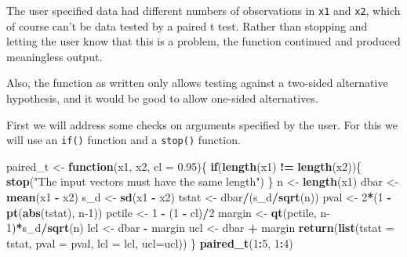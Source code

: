\documentclass[
]{krantz}
\newenvironment{Shaded}{\begin{snugshade}}{\end{snugshade}}
\newcommand{\ControlFlowTok}[1]{\textcolor[rgb]{0.13,0.29,0.53}{\textbf{#1}}}
\newcommand{\DataTypeTok}[1]{\textcolor[rgb]{0.13,0.29,0.53}{#1}}
\newcommand{\DecValTok}[1]{\textcolor[rgb]{0.00,0.00,0.81}{#1}}
\newcommand{\FloatTok}[1]{\textcolor[rgb]{0.00,0.00,0.81}{#1}}
\newcommand{\KeywordTok}[1]{\textcolor[rgb]{0.13,0.29,0.53}{\textbf{#1}}}
\newcommand{\NormalTok}[1]{#1}
\newcommand{\OperatorTok}[1]{\textcolor[rgb]{0.81,0.36,0.00}{\textbf{#1}}}
\newcommand{\StringTok}[1]{\textcolor[rgb]{0.31,0.60,0.02}{#1}}
\begin{document}
The user specified data had different numbers of observations in \texttt{x1} and \texttt{x2}, which of course can't be data tested by a paired t test. Rather than stopping and letting the user know that this is a problem, the function continued and produced meaningless output.

Also, the function as written only allows testing against a two-sided alternative hypothesis, and it would be good to allow one-sided alternatives.

First we will address some checks on arguments specified by the user. For this we will use an \texttt{if()} function and a \texttt{stop()} function.

\begin{Shaded}
\begin{Highlighting}[]
\NormalTok{paired\_t \textless{}{-}}\StringTok{ }\ControlFlowTok{function}\NormalTok{(x1, x2, }\DataTypeTok{cl =} \FloatTok{0.95}\NormalTok{)\{}
    \ControlFlowTok{if}\NormalTok{(}\KeywordTok{length}\NormalTok{(x1) }\OperatorTok{!=}\StringTok{ }\KeywordTok{length}\NormalTok{(x2))\{}
        \KeywordTok{stop}\NormalTok{(}\StringTok{"The input vectors  must have the same length"}\NormalTok{)}
\NormalTok{    \}}
\NormalTok{    n \textless{}{-}}\StringTok{ }\KeywordTok{length}\NormalTok{(x1)}
\NormalTok{    dbar \textless{}{-}}\StringTok{ }\KeywordTok{mean}\NormalTok{(x1 }\OperatorTok{{-}}\StringTok{ }\NormalTok{x2)}
\NormalTok{    s\_d \textless{}{-}}\StringTok{ }\KeywordTok{sd}\NormalTok{(x1 }\OperatorTok{{-}}\StringTok{ }\NormalTok{x2)}
\NormalTok{    tstat \textless{}{-}}\StringTok{ }\NormalTok{dbar}\OperatorTok{/}\NormalTok{(s\_d}\OperatorTok{/}\KeywordTok{sqrt}\NormalTok{(n))}
\NormalTok{    pval \textless{}{-}}\StringTok{ }\DecValTok{2}\OperatorTok{*}\NormalTok{(}\DecValTok{1} \OperatorTok{{-}}\StringTok{ }\KeywordTok{pt}\NormalTok{(}\KeywordTok{abs}\NormalTok{(tstat), n}\DecValTok{{-}1}\NormalTok{))}
\NormalTok{    pctile \textless{}{-}}\StringTok{ }\DecValTok{1} \OperatorTok{{-}}\StringTok{ }\NormalTok{(}\DecValTok{1} \OperatorTok{{-}}\StringTok{ }\NormalTok{cl)}\OperatorTok{/}\DecValTok{2}
\NormalTok{    margin \textless{}{-}}\StringTok{ }\KeywordTok{qt}\NormalTok{(pctile, n}\DecValTok{{-}1}\NormalTok{)}\OperatorTok{*}\NormalTok{s\_d}\OperatorTok{/}\KeywordTok{sqrt}\NormalTok{(n)}
\NormalTok{    lcl \textless{}{-}}\StringTok{ }\NormalTok{dbar }\OperatorTok{{-}}\StringTok{ }\NormalTok{margin}
\NormalTok{    ucl \textless{}{-}}\StringTok{ }\NormalTok{dbar }\OperatorTok{+}\StringTok{ }\NormalTok{margin}
    \KeywordTok{return}\NormalTok{(}\KeywordTok{list}\NormalTok{(}\DataTypeTok{tstat =}\NormalTok{ tstat, }\DataTypeTok{pval =}\NormalTok{ pval, }\DataTypeTok{lcl =}\NormalTok{ lcl, }\DataTypeTok{ucl=}\NormalTok{ucl))}
\NormalTok{\}}
\KeywordTok{paired\_t}\NormalTok{(}\DecValTok{1}\OperatorTok{:}\DecValTok{5}\NormalTok{, }\DecValTok{1}\OperatorTok{:}\DecValTok{4}\NormalTok{)}
\end{Highlighting}
\end{Shaded}
\end{document}
